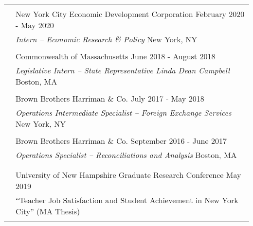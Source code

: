 \documentclass[letterpaper, 11pt]{article}
\begin{document}
\begin{longtable}{p{0.1in}p{5.9in}}

\multicolumn{2}{l}{\color{Maroon}{INDUSTRY EXPERIENCE}}\\

& New York City Economic Development Corporation \hfill February 2020 - May 2020 \\
& {\sl Intern -- Economic Research \& Policy} \hfill New York, NY\\ & \\

\pagebreak

& Commonwealth of Massachusetts \hfill June 2018 - August 2018 \\
& {\sl Legislative Intern -- State Representative Linda Dean Campbell} \hfill Boston, MA\\ & \\

& Brown Brothers Harriman \& Co. \hfill July 2017 - May 2018 \\
& {\sl Operations Intermediate Specialist – Foreign Exchange Services} \hfill New York, NY \\ & \\

& Brown Brothers Harriman \& Co. \hfill September 2016 - June 2017 \\
& {\sl Operations Specialist – Reconciliations and Analysis} \hfill Boston, MA \\ & \\


{\color{Maroon}{PRESENTATIONS}} \\

& University of New Hampshire Graduate Research Conference \hfill May 2019 \\
& \hspace{10pt} “Teacher Job Satisfaction and Student Achievement in New York City” (MA Thesis) \\ & \\


\end{longtable}
\end{document}
